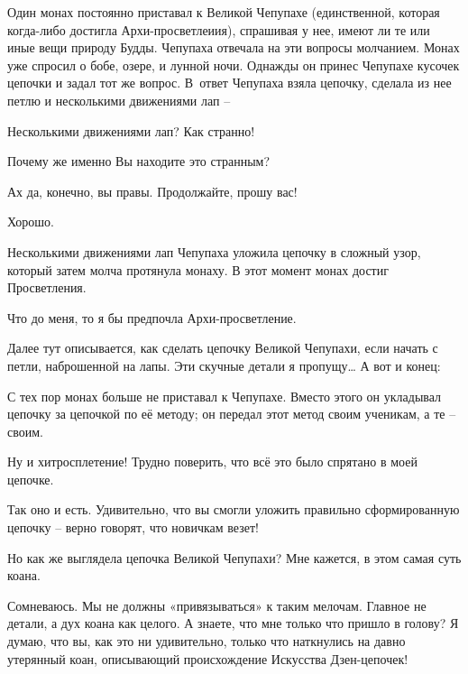 \documentclass[../main.tex]{subfiles}
\begin{document}
\begin{dialogue}
\begin{koan}
    Один монах постоянно приставал к Великой Чепупахе (единственной, которая когда-либо достигла Архи-просветлеиия), спрашивая у нее, имеют ли те или иные вещи природу Будды. Чепупаха отвечала на эти вопросы молчанием. Монах уже спросил о бобе, озере, и лунной ночи. Однажды он принес Чепупахе кусочек цепочки и задал тот же вопрос. В~ответ Чепупаха взяла цепочку, сделала из нее петлю и несколькими движениями лап \---
\end{koan}

 Несколькими движениями лап? Как странно!

 Почему же именно Вы находите это странным?

 Ах да, конечно, вы правы. Продолжайте, прошу вас!

 Хорошо.

\begin{koan}
    Несколькими движениями лап Чепупаха уложила цепочку в сложный узор, который затем молча протянула монаху. В этот момент монах достиг Просветления.
\end{koan}

 Что до меня, то я бы предпочла Архи-просветление.

 Далее тут описывается, как сделать цепочку Великой Чепупахи, если начать с петли, наброшенной на лапы. Эти скучные детали я пропущу\ldots{} А вот и конец:

\begin{koan}
    С тех пор монах больше не приставал к Чепупахе. Вместо этого он укладывал цепочку за цепочкой по её методу; он передал этот метод своим ученикам, а те \--- своим.
\end{koan}

 Ну и хитросплетение! Трудно поверить, что всё это было спрятано в моей цепочке.

 Так оно и есть. Удивительно, что вы смогли уложить правильно сформированную цепочку \--- верно говорят, что новичкам везет!

 Но как же выглядела цепочка Великой Чепупахи? Мне кажется, в этом самая суть коана.

 Сомневаюсь. Мы не должны «привязываться» к таким мелочам. Главное не детали, а дух коана как целого. А знаете, что мне только что пришло в голову? Я думаю, что вы, как это ни удивительно, только что наткнулись на давно утерянный коан, описывающий происхождение Искусства Дзен-цепочек!


\end{dialogue}
\end{document}
